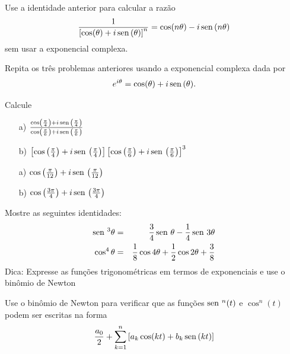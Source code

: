 \begin{exer}Use a identidade anterior para calcular a razão
\begin{equation}\frac{1}{\left[\cos(\theta)+i\operatorname{sen}\,(\theta)\right]^n}=\cos(n\theta)-i\operatorname{sen}\,(n\theta)\end{equation}
sem usar a exponencial complexa.
\end{exer}
\begin{exer}Repita os três problemas anteriores usando a exponencial complexa dada por
\begin{equation}e^{i\theta}=\cos(\theta)+i\operatorname{sen}\,(\theta).\end{equation}
\end{exer}
\begin{exer} Calcule
\begin{itemize}
\item[a)] $\frac{\cos\left(\frac{\pi}{4}\right)+i\operatorname{sen}\,\left(\frac{\pi}{4}\right)}{\cos\left(\frac{\pi}{6}\right)+i\operatorname{sen}\,\left(\frac{\pi}{6}\right)}$
\item[b)] $\left[\cos\left(\frac{\pi}{4}\right)+i\operatorname{sen}\,\left(\frac{\pi}{4}\right)\right]\left[\cos\left(\frac{\pi}{6}\right)+i\operatorname{sen}\,\left(\frac{\pi}{6}\right)\right]^3$
\end{itemize}
\end{exer}
\begin{resp} 
\begin{itemize}
\item[a)] $\cos\left(\frac{\pi}{12}\right)+i\operatorname{sen}\,\left(\frac{\pi}{12}\right)$
\item[b)] $\cos\left(\frac{3\pi}{4}\right)+i\operatorname{sen}\,\left(\frac{3\pi}{4}\right)$
\end{itemize}
\end{resp}
\begin{exer}Mostre as seguintes identidades:
\begin{eqnarray*}
\operatorname{sen}\,^3\theta&=&\frac{3}{4}\operatorname{sen}\,\theta-\frac{1}{4}\operatorname{sen}\, 3\theta\\
\cos^4\theta&=&\frac{1}{8}\cos 4\theta+\frac{1}{2}\cos 2\theta+\frac{3}{8}
\end{eqnarray*}
Dica: Expresse as funções trigonométricas em termos de exponenciais e use o  binômio de Newton 
\end{exer}
\begin{exer}Use o binômio de Newton para verificar que as funções $\operatorname{sen}\,^n(t)$ e $\cos^n(t)$ podem ser escritas na forma 
\begin{equation}\frac{a_0}{2}+\sum_{k=1}^n \left[a_k\cos(kt)+b_k\operatorname{sen}\,(kt)\right]\end{equation}
\end{exer}

